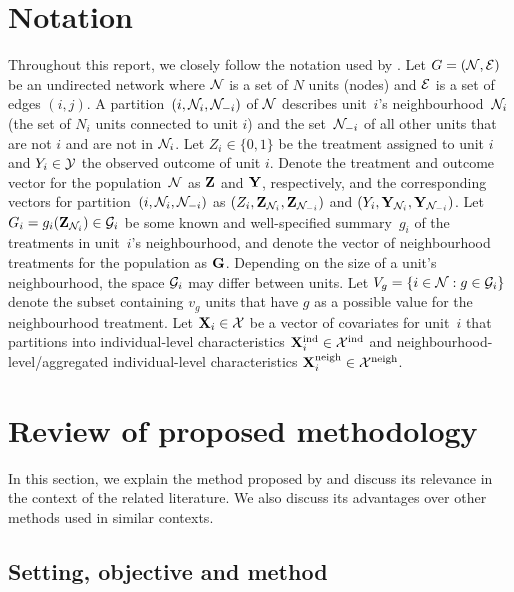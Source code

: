 \documentclass[10pt]{article}
\begin{document}
\section{Notation} \label{sec:notation}

Throughout this report, we closely follow the notation used by \textcite{Forastiere:2021}. Let $G=(\mathcal{N},\mathcal{E})$ be an undirected network where $\mathcal{N}$ is a set of $N$ units (nodes) and $\mathcal{E}$ is a set of edges $(i,j)$. A partition~$(i,\mathcal{N}_i,\mathcal{N}_{-i})$ of $\mathcal{N}$ describes unit~$i$'s neighbourhood~$\mathcal{N}_i$ (the set of $N_i$ units connected to unit $i$) and the set~$\mathcal{N}_{-i}$ of all other units that are not $i$ and are not in $\mathcal{N}_i$. Let $Z_i\in\{0,1\}$ be the treatment assigned to unit $i$ and $Y_i\in\mathcal{Y}$ the observed outcome of unit $i$. Denote the treatment and outcome vector for the population~$\mathcal{N}$ as $\mathbf{Z}$ and $\mathbf{Y}$, respectively, and the corresponding vectors for partition~$(i,\mathcal{N}_i,\mathcal{N}_{-i})$ as $(Z_i,\mathbf{Z}_{\mathcal{N}_i},\mathbf{Z}_{\mathcal{N}_{-i}})$ and $(Y_i,\mathbf{Y}_{\mathcal{N}_i},\mathbf{Y}_{\mathcal{N}_{-i}})$. Let $G_i=g_i(\mathbf{Z}_{\mathcal{N}_i})\in\mathcal{G}_i$ be some known and well-specified summary~$g_i$ of the treatments in unit~$i$'s neighbourhood, and denote the vector of neighbourhood treatments for the population as $\mathbf{G}$. Depending on the size of a unit's neighbourhood, the space $\mathcal{G}_i$ may differ between units. Let $V_g=\{i\in\mathcal{N}:g\in\mathcal{G}_i\}$ denote the subset containing $v_g$ units that have $g$ as a possible value for the neighbourhood treatment. Let $\mathbf{X}_i\in\mathcal{X}$ be a vector of covariates for unit~$i$ that partitions into individual-level characteristics $\mathbf{X}^{\text{ind}}_i\in\mathcal{X}^\text{ind}$ and neighbourhood-level/aggregated individual-level characteristics $\mathbf{X}^{\text{neigh}}_i\in\mathcal{X}^\text{neigh}$.


\section{Review of proposed methodology} \label{sec:summary}

\todo In this section, we explain the method proposed by \textcite{Forastiere:2021} and discuss its relevance in the context of the related literature. We also discuss its advantages over other methods used in similar contexts.

\subsection{Setting, objective and method}\label{sec:method}
\end{document}
